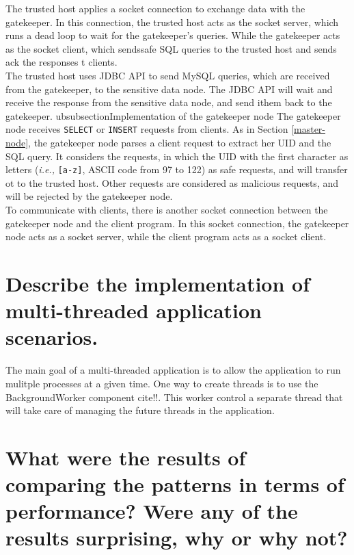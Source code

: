 \documentclass{article}
\begin{document}
The trusted host applies a socket connection to exchange data with the gatekeeper. In this connection, the trusted host acts as the socket server, which runs a dead loop to wait for the gatekeeper's queries. While the gatekeeper acts as the socket client, which sendssafe SQL queries to the trusted host and sends ack the responses t clients.\\

The trusted host uses JDBC API to send MySQL queries, which are received from the gatekeeper, to the sensitive data node. The JDBC API will wait and receive the response from the sensitive data node, and send ithem back to the gatekeeper.                                                         ubsubsection{Implementation of the gatekeeper node}
The gatekeeper node receives \texttt{SELECT} or \texttt{INSERT} requests from clients. As in Section \ref{master-node}, the gatekeeper node parses a client request to extract her UID and the SQL query. It considers the requests, in which the UID with the first character as letters (\emph{i.e.,} \texttt{[a-z]}, ASCII code from 97 to 122) as safe requests, and will transfer ot to the trusted host. Other requests are considered as malicious requests, and will be rejected by the gatekeeper node. \\

To communicate with clients, there is another socket connection between the gatekeeper node and the client program. In this socket connection, the gatekeeper node acts as a socket server, while the client program acts as a socket client.


\section{Describe the implementation of multi-threaded application scenarios.}\label{Q4}

The main goal of a multi-threaded application is to allow the application to run mulitple processes at a given time. One way to create threads is to use the 
BackgroundWorker component cite!!. This worker control a separate thread that will take care of managing the future threads in the application. 




\section{What were the results of comparing the patterns in terms of performance? Were any of the results surprising, why or why not?}\label{Q5}
\end{document}
